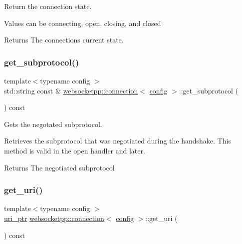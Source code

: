 Return the connection state. 

Values can be connecting, open, closing, and closed

\begin{DoxyReturn}{Returns}
The connection\textquotesingle{}s current state. 
\end{DoxyReturn}
\mbox{\label{classwebsocketpp_1_1connection_ae8577184f6e4d82955cc38e1a9f8164b}} 
\subsubsection{\texorpdfstring{get\+\_\+subprotocol()}{get\_subprotocol()}}
{\footnotesize\ttfamily template$<$typename config $>$ \\
std\+::string const  \& \mbox{\hyperlink{classwebsocketpp_1_1connection}{websocketpp\+::connection}}$<$ \mbox{\hyperlink{classconfig}{config}} $>$\+::get\+\_\+subprotocol (\begin{DoxyParamCaption}{ }\end{DoxyParamCaption}) const}



Gets the negotated subprotocol. 

Retrieves the subprotocol that was negotiated during the handshake. This method is valid in the open handler and later.

\begin{DoxyReturn}{Returns}
The negotiated subprotocol 
\end{DoxyReturn}
\mbox{\label{classwebsocketpp_1_1connection_a63f906681e9363f40dce7d2b65444a41}} 
\subsubsection{\texorpdfstring{get\+\_\+uri()}{get\_uri()}}
{\footnotesize\ttfamily template$<$typename config $>$ \\
\mbox{\hyperlink{namespacewebsocketpp_aae370ea5ac83a8ece7712cb39fc23f5b}{uri\+\_\+ptr}} \mbox{\hyperlink{classwebsocketpp_1_1connection}{websocketpp\+::connection}}$<$ \mbox{\hyperlink{classconfig}{config}} $>$\+::get\+\_\+uri (\begin{DoxyParamCaption}{ }\end{DoxyParamCaption}) const}



